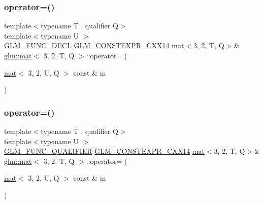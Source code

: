 \subsubsection{\texorpdfstring{operator=()}{operator=()}\hspace{0.1cm}{\footnotesize\ttfamily [2/3]}}
{\footnotesize\ttfamily template$<$typename T , qualifier Q$>$ \\
template$<$typename U $>$ \\
\hyperlink{setup_8hpp_ab2d052de21a70539923e9bcbf6e83a51}{G\+L\+M\+\_\+\+F\+U\+N\+C\+\_\+\+D\+E\+CL} \hyperlink{setup_8hpp_a4dd12abf5e1164bc57f3a34671d03844}{G\+L\+M\+\_\+\+C\+O\+N\+S\+T\+E\+X\+P\+R\+\_\+\+C\+X\+X14} \hyperlink{structglm_1_1mat}{mat}$<$3, 2, T, Q$>$\& \hyperlink{structglm_1_1mat}{glm\+::mat}$<$ 3, 2, T, Q $>$\+::operator= (\begin{DoxyParamCaption}\item[{\hyperlink{structglm_1_1mat}{mat}$<$ 3, 2, U, Q $>$ const \&}]{m }\end{DoxyParamCaption})}

\mbox{\label{structglm_1_1mat_3_013_00_012_00_01_t_00_01_q_01_4_a5665b9b94c9f67c56cc7d9f6ac569ef2}} 
\subsubsection{\texorpdfstring{operator=()}{operator=()}\hspace{0.1cm}{\footnotesize\ttfamily [3/3]}}
{\footnotesize\ttfamily template$<$typename T , qualifier Q$>$ \\
template$<$typename U $>$ \\
\hyperlink{setup_8hpp_a33fdea6f91c5f834105f7415e2a64407}{G\+L\+M\+\_\+\+F\+U\+N\+C\+\_\+\+Q\+U\+A\+L\+I\+F\+I\+ER} \hyperlink{setup_8hpp_a4dd12abf5e1164bc57f3a34671d03844}{G\+L\+M\+\_\+\+C\+O\+N\+S\+T\+E\+X\+P\+R\+\_\+\+C\+X\+X14} \hyperlink{structglm_1_1mat}{mat}$<$3, 2, T, Q$>$\& \hyperlink{structglm_1_1mat}{glm\+::mat}$<$ 3, 2, T, Q $>$\+::operator= (\begin{DoxyParamCaption}\item[{\hyperlink{structglm_1_1mat}{mat}$<$ 3, 2, U, Q $>$ const \&}]{m }\end{DoxyParamCaption})}



